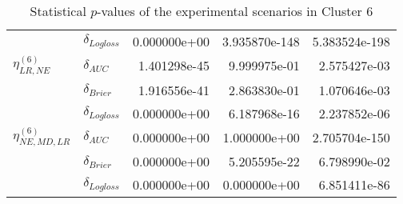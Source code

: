 \begin{table}[!h]
\begin{tabular}{l|lrrr}
                              & $\delta_{Logloss}$ &           0.000000e+00 &    3.935870e-148 &            5.383524e-198 \\
    $\eta^{(6)}_{LR, NE}$ & $\delta_{AUC}$ &           1.401298e-45 &     9.999975e-01 &             2.575427e-03 \\
                              & $\delta_{Brier}$ &           1.916556e-41 &     2.863830e-01 &             1.070646e-03 \\
                              & $\delta_{Logloss}$ &           0.000000e+00 &     6.187968e-16 &             2.237852e-06 \\
    $\eta^{(6)}_{NE, MD, LR}$ & $\delta_{AUC}$ &           0.000000e+00 &     1.000000e+00 &            2.705704e-150 \\
                              & $\delta_{Brier}$ &           0.000000e+00 &     5.205595e-22 &             6.798990e-02 \\
                              & $\delta_{Logloss}$ &           0.000000e+00 &     0.000000e+00 &             6.851411e-86 \\
    \bottomrule
    \end{tabular}
    \caption{Statistical $p$-values of the experimental scenarios in Cluster 6}
    \end{table}
